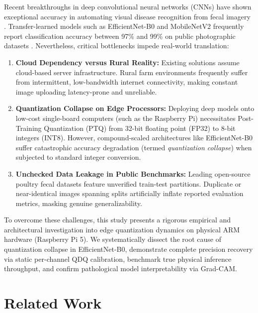 \documentclass[11pt,a4paper]{article}
\begin{document}
Recent breakthroughs in deep convolutional neural networks (CNNs) have shown exceptional accuracy in automating visual disease recognition from fecal imagery \cite{dhungana2025, degan2023}. Transfer-learned models such as EfficientNet-B0 and MobileNetV2 frequently report classification accuracy between 97\% and 99\% on public photographic datasets \cite{tasdelen2025}. Nevertheless, critical bottlenecks impede real-world translation:
\begin{enumerate}
    \item \textbf{Cloud Dependency versus Rural Reality:} Existing solutions assume cloud-based server infrastructure. Rural farm environments frequently suffer from intermittent, low-bandwidth internet connectivity, making constant image uploading latency-prone and unreliable.
    \item \textbf{Quantization Collapse on Edge Processors:} Deploying deep models onto low-cost single-board computers (such as the Raspberry Pi) necessitates Post-Training Quantization (PTQ) from 32-bit floating point (FP32) to 8-bit integers (INT8). However, compound-scaled architectures like EfficientNet-B0 suffer catastrophic accuracy degradation (termed \textit{quantization collapse}) when subjected to standard integer conversion.
    \item \textbf{Unchecked Data Leakage in Public Benchmarks:} Leading open-source poultry fecal datasets feature unverified train-test partitions. Duplicate or near-identical images spanning splits artificially inflate reported evaluation metrics, masking genuine generalizability.
\end{enumerate}

To overcome these challenges, this study presents a rigorous empirical and architectural investigation into edge quantization dynamics on physical ARM hardware (Raspberry Pi 5). We systematically dissect the root cause of quantization collapse in EfficientNet-B0, demonstrate complete precision recovery via static per-channel QDQ calibration, benchmark true physical inference throughput, and confirm pathological model interpretability via Grad-CAM.

\section{Related Work}
\end{document}
